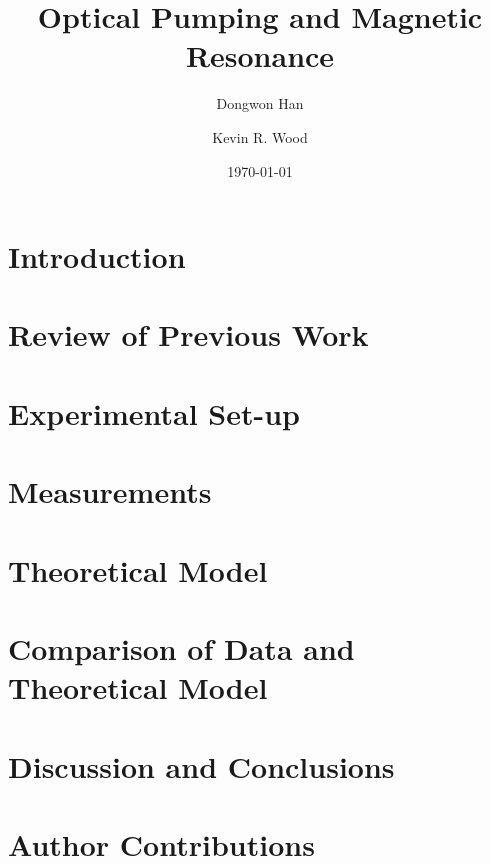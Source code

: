 \documentclass[aps,prl,twocolumn,groupedaddress]{revtex4-1}
\begin{document}
\title{Optical Pumping and Magnetic Resonance}
\author{Dongwon Han}
\author{Kevin R. Wood}


\date{\today}

\begin{abstract}
\end{abstract}

\maketitle

\section{Introduction}
\section{Review of Previous Work}
\section{Experimental Set-up}
\section{Measurements}
\section{Theoretical Model}
\section{Comparison of Data and Theoretical Model}
\section{Discussion and Conclusions}
\section{Author Contributions}


\end{document}
